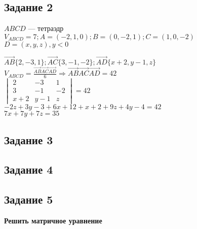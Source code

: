 \documentclass{article}
\theoremstyle{definition}
\theoremstyle{plain}
\begin{document}
\subsection{Задание 2}
$ABCD$ --- тетраэдр\\
$V_{ABCD} = 7; A = (-2,1,0); B = (0, -2, 1); C = (1, 0, -2)$\\
$D = (x, y, z), y < 0$

$\vec{AB}\{2, -3, 1\}; \vec{AC}\{3, -1, -2\}; \vec{AD}\{x + 2, y - 1, z\}$\\
$V_{ABCD} = \frac{\vec{AB}\vec{AC}\vec{AD}}{6} \Rightarrow \vec{AB}\vec{AC}\vec{AD} = 42$\\
$\begin{vmatrix}
  2 & -3 & 1\\
  3 & -1 & -2\\
  x+2 & y-1 & z
\end{vmatrix}
= 42$\\
$-2z + 3y - 3 + 6x + 12 + x + 2 + 9z + 4y - 4 = 42$\\
$7x + 7y + 7z = 35$\\
\subsection{Задание 3}
\subsection{Задание 4}
\subsection{Задание 5}
\textbf{Решить матричное уравнение}
\end{document}
